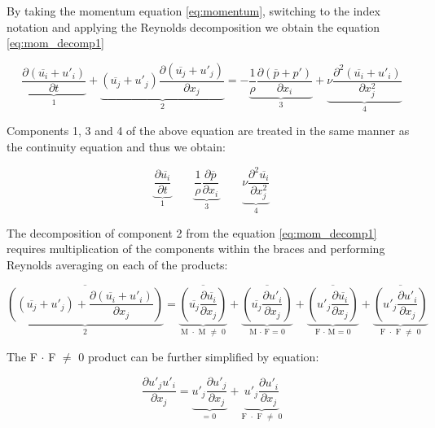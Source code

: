 By taking the momentum equation \ref{eq:momentum}, switching to the index notation and applying the Reynolds decomposition we obtain the equation \ref{eq:mom_decomp1}

\begin{equation} \label{eq:mom_decomp1}
\underbrace{\frac{\partial \left( \overline{u_i} + u'_i \right)}{\partial t}}_\text{1} 
+ \underbrace{\left( \overline{u_j} + u'_j \right) \frac{\partial \left( \overline{u_j} + u'_j \right)}{\partial x_j}}_\text{2} 
=
- \underbrace{\frac{1}{\rho} \frac{\partial \left( \overline{p} + p' \right)}{\partial x_i}}_\text{3} 
+ \underbrace{\nu \frac{\partial^2 \left( \overline{u_i} + u'_i \right)}{\partial x_j^2}}_\text{4} 
\end{equation}

Components 1, 3 and 4 of the above equation are treated in the same manner as the continuity equation and thus we obtain:

\begin{equation} \label{eq:mom_components}
\underbrace{\frac{\partial \overline{u_i}}{\partial t}}_\text{1}
\qquad
\underbrace{\frac{1}{\rho} \frac{\partial \overline{p}}{\partial x_i}}_\text{3}
\qquad
\underbrace{\nu \frac{\partial^2 \overline{u_i}}{\partial x_j^2}}_\text{4}
\end{equation}

The decomposition of component 2 from the equation \ref{eq:mom_decomp1} requires multiplication of the components within the braces and performing Reynolds averaging on each of the products: 

\begin{equation} \label{eq:mom_comp2_avg}
\underbrace{\overline {\left( \left( \overline{u_j} + u'_j \right) + \frac{\partial \left( \overline{u_i} + u'_i \right)}{\partial x_j} \right)}}_\text{2}
= \underbrace{\overline{\left( \overline{u_j} \frac{\partial \overline{u_i}}{\partial x_j} \right)}}_\text{M $\cdot$ M $\neq$ 0}
+ \underbrace{\overline{\left( \overline{u_j} \frac{\partial u'_i}{\partial x_j} \right)}}_\text{M $\cdot$ F = 0}
+ \underbrace{\overline{\left( u'_j \frac{\partial \overline{u_i}}{\partial x_j} \right)}}_\text{F $\cdot$ M = 0}
+ \underbrace{\overline{\left( u'_j \frac{\partial u'_i}{\partial x_j} \right)}}_\text{F $\cdot$ F $\neq$ 0}
\end{equation}

The F $\cdot$ F $\neq$ 0 product can be further simplified by equation:

\begin{equation} \label{eq:ff}
\frac{\partial u'_j u'_i}{\partial x_j}
= \underbrace{u'_j \frac{\partial u'_j}{\partial x_j}}_\text{= 0}
+ \underbrace{u'_j \frac{\partial u'_i}{\partial x_j}}_\text{F $\cdot$ F $\neq$ 0}
\end{equation}

